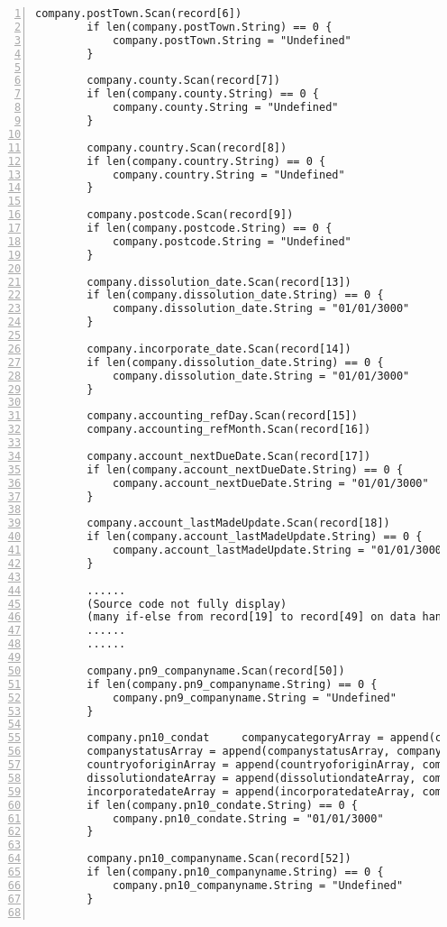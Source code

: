 \begin{lstlisting}[breaklines, frame=single, numbers=left, caption={Parse and cleaned data retrieved from CSV}, label=commandline-02]
		company.postTown.Scan(record[6])
		if len(company.postTown.String) == 0 {
			company.postTown.String = "Undefined"
		}
		
		company.county.Scan(record[7])
		if len(company.county.String) == 0 {
			company.county.String = "Undefined"
		}
		
		company.country.Scan(record[8])
		if len(company.country.String) == 0 {
			company.country.String = "Undefined"
		}
		
		company.postcode.Scan(record[9])
		if len(company.postcode.String) == 0 {
			company.postcode.String = "Undefined"
		}
		
		company.dissolution_date.Scan(record[13])
		if len(company.dissolution_date.String) == 0 {
			company.dissolution_date.String = "01/01/3000"
		}
		
		company.incorporate_date.Scan(record[14])
		if len(company.dissolution_date.String) == 0 {
			company.dissolution_date.String = "01/01/3000"
		}
		
		company.accounting_refDay.Scan(record[15])
		company.accounting_refMonth.Scan(record[16])
		
		company.account_nextDueDate.Scan(record[17])
		if len(company.account_nextDueDate.String) == 0 {
			company.account_nextDueDate.String = "01/01/3000"
		}
		
		company.account_lastMadeUpdate.Scan(record[18])
		if len(company.account_lastMadeUpdate.String) == 0 {
			company.account_lastMadeUpdate.String = "01/01/3000"
		}
		
		...... 
		(Source code not fully display)
		(many if-else from record[19] to record[49] on data handling to eliminate NULL values ....)
		......
		......
		
		company.pn9_companyname.Scan(record[50])
		if len(company.pn9_companyname.String) == 0 {
			company.pn9_companyname.String = "Undefined"
		}
		
		company.pn10_condat		companycategoryArray = append(companycategoryArray, company.category.String) 
		companystatusArray = append(companystatusArray, company.status.String) 
		countryoforiginArray = append(countryoforiginArray, company.countryOfOrigin.String)
		dissolutiondateArray = append(dissolutiondateArray, company.dissolution_date.String) 
		incorporatedateArray = append(incorporatedateArray, company.incorporate_date.String) e.Scan(record[51])
		if len(company.pn10_condate.String) == 0 {
			company.pn10_condate.String = "01/01/3000"
		}
		
		company.pn10_companyname.Scan(record[52])
		if len(company.pn10_companyname.String) == 0 {
			company.pn10_companyname.String = "Undefined"
		}
		

\end{lstlisting}
